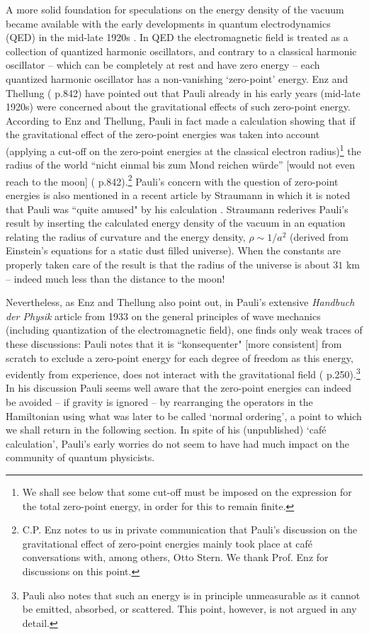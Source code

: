\documentclass[12pt]{article}
\begin{document}
A more solid foundation for speculations on the energy density of
the vacuum became available with the early developments in quantum
electrodynamics (QED) in the mid-late 1920s \cite{schweber94}. In
QED the electromagnetic field is treated as a collection of
quantized harmonic oscillators, and contrary to a classical
harmonic oscillator -- which can be completely at rest and have
zero energy -- each quantized harmonic oscillator has a
non-vanishing `zero-point' energy. Enz and Thellung (\cite{enz60}
p.842) have pointed out that Pauli already in his early years
(mid-late 1920s) were concerned about the gravitational effects of
such zero-point energy. According to Enz and Thellung, Pauli in
fact made a calculation showing that if the gravitational effect
of the zero-point energies was taken into account (applying a
cut-off on the zero-point energies at the classical electron
radius)\footnote{We shall see below that some cut-off must be
imposed on the expression for the total zero-point energy, in
order for this to remain finite.} the radius of the world ``nicht
einmal bis zum Mond reichen w{\"u}rde'' [would not even reach to
the moon] (\cite{enz60} p.842).\footnote{C.P. Enz notes to us in
private communication that Pauli's discussion on the gravitational
effect of zero-point energies mainly took place at caf\' e
conversations with, among others, Otto Stern. We thank Prof. Enz
for discussions on this point.} Pauli's concern with the question
of zero-point energies is also mentioned in a recent article by
Straumann in which it is noted that Pauli was ``quite amused" by
his calculation \cite{straumann99}. Straumann rederives Pauli's
result by inserting the calculated energy density of the vacuum in
an equation relating the radius of curvature and the energy
density, $\rho \sim 1/a^2$ (derived from Einstein's equations
for a static dust filled universe). When the constants are
properly taken care of the result is that the radius of the
universe is about $31$ km -- indeed much less than the distance to
the moon! 

Nevertheless, as Enz and Thellung also point out, in Pauli's
extensive {\em Handbuch der Physik} article from 1933 on the
general principles of wave mechanics (including quantization of
the electromagnetic field), one finds only weak traces of these
discussions: Pauli notes that it is ``konsequenter" [more
consistent] from scratch to exclude a zero-point energy for each
degree of freedom as this energy, evidently from experience, does
not interact with the gravitational field (\cite{pauli33}
p.250).\footnote{Pauli also notes that such an energy is in
principle unmeasurable as it cannot be emitted, absorbed, or
scattered. This point, however, is not argued in any detail.} In
his discussion Pauli seems well aware that the zero-point energies
can indeed be avoided -- if gravity is ignored -- by rearranging
the operators in the Hamiltonian using what was later to be called
`normal ordering', a point to which we shall return in the
following section. In spite of his (unpublished) `caf\' e
calculation', Pauli's early worries do not seem to have had much
impact on the community of quantum physicists. 
\end{document}
